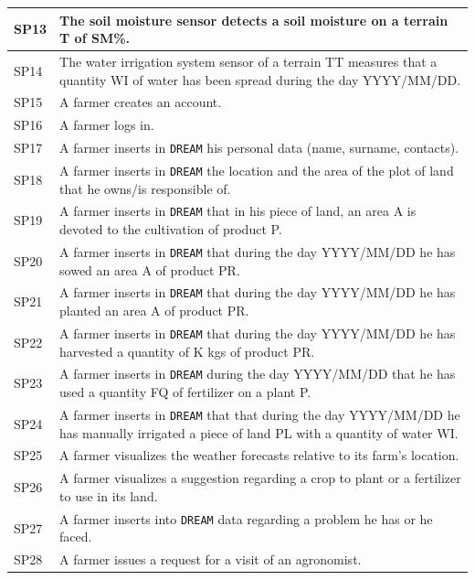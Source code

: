 \documentclass{article}
\begin{document}
\begin{longtable}[c]{|m{0.75cm}|m{11cm}|}
 SP13 & The soil moisture sensor detects a soil moisture on a terrain T of SM\%.\\
 \hline

  SP14 & The water irrigation system  sensor of a terrain TT measures that a quantity WI of water  has been spread during the day YYYY/MM/DD.\\
 \hline

  SP15 & A farmer creates an account.\\
 \hline
  SP16 & A farmer logs in.\\
 \hline
 SP17 & A farmer inserts in \verb|DREAM| his personal data (name, surname, contacts).\\
 \hline
 SP18 & A farmer inserts in \verb|DREAM| the location and the area of the plot of land that he owns/is responsible of.\\
 \hline
 SP19 & A farmer inserts in \verb|DREAM| that in his piece of land, an area A is devoted to the cultivation of product P.\\
 \hline
 SP20 & A farmer inserts in \verb|DREAM| that during the day YYYY/MM/DD  he has sowed an area A of product PR.\\
  \hline
 SP21 & A farmer inserts in \verb|DREAM| that during the day YYYY/MM/DD  he has planted an area A of product PR.\\
 \hline
 SP22 & A farmer inserts in \verb|DREAM| that during the day YYYY/MM/DD he has harvested a quantity of K kgs of product PR.\\
 \hline
 SP23 & A farmer inserts in \verb|DREAM| during the day YYYY/MM/DD  that he has used a quantity FQ of fertilizer on a plant P.\\
 \hline
 SP24 & A farmer inserts in \verb|DREAM| that that during the day YYYY/MM/DD he has manually irrigated a piece of land PL with a quantity of water WI.\\
 \hline
 SP25 & A farmer visualizes the weather forecasts relative to its farm's location.\\
 \hline
 SP26 & A farmer visualizes a suggestion regarding a crop to plant or a fertilizer to use in its land.\\
 \hline
 SP27 & A farmer inserts into \verb|DREAM| data regarding a problem he has or he faced.\\
 \hline
 SP28 & A farmer issues a request for a visit of an agronomist.\\

\end{longtable}
\end{document}
